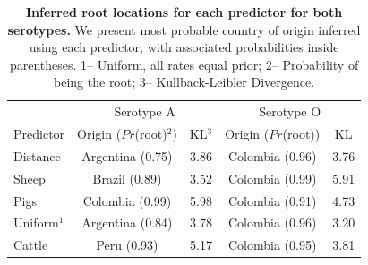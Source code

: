 \documentclass[10pt]{article}
\begin{document}
\begin{table}[H]
\caption{
\textbf{Inferred root locations for each predictor for both serotypes.} We present most probable country of origin inferred using each predictor, with associated probabilities inside parentheses. 1-- Uniform, all rates equal prior; 2-- Probability of being the root; 3-- Kullback-Leibler Divergence.
}
\begin{center}
\begin{tabular}{lcccc}
\toprule
& \multicolumn{2}{c}{Serotype A}&\multicolumn{2}{c}{Serotype O}\\
Predictor& Origin ($Pr$(root)$^2$)& KL$^3$&Origin ($Pr$(root))& KL\\
\midrule
Distance & Argentina (0.75)&3.86& Colombia (0.96)&3.76\\
Sheep    & Brazil (0.89) &3.52 & Colombia (0.99)&5.91\\
Pigs      & Colombia (0.99)& 5.98&Colombia (0.91)&4.73\\
Uniform$^1$  & Argentina (0.84)& 3.78&Colombia (0.96)&3.20\\
Cattle   & Peru (0.93)& 5.17 &Colombia (0.95)&3.81\\
 \bottomrule
\end{tabular}
\end{center}
\begin{flushleft}
\end{flushleft}
\label{tab:roots}
 \end{table}
\end{document}
